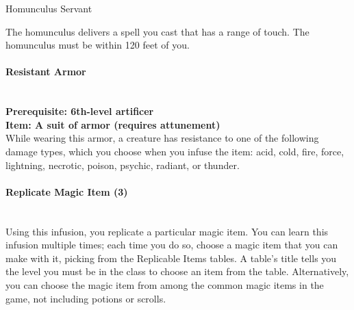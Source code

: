 {\begin{DndMonster}[width=0.5\textwidth]{Homunculus Servant}
	\DndMonsterAttack[
      name=Force Strike,
      distance=ranged, %
      mod=\calculateSpellAttack{\calculateModifier{\IntelligenceScoreValue}},
      range=30,
      targets=one target you can see,
      dmg=\DndDice{1d4} + PB,
      dmg-type=force,
    ]
    
	The homunculus delivers a spell you cast that has a range of touch. The homunculus must be within 120 feet of you.	
\end{DndMonster}
\paragraph*{Resistant Armor}\hfill\\
\textbf{Prerequisite: 6th-level artificer}\\
\textbf{Item: A suit of armor (requires attunement)}\\
While wearing this armor, a creature has resistance to one of the following damage types, which you choose when you infuse the item: acid, cold, fire, force, lightning, necrotic, poison, psychic, radiant, or thunder.\\
\paragraph*{Replicate Magic Item (3)}\hfill\\
Using this infusion, you replicate a particular magic item. You can learn this infusion multiple times; each time you do so, choose a magic item that you can make with it, picking from the Replicable Items tables. A table's title tells you the level you must be in the class to choose an item from the table. Alternatively, you can choose the magic item from among the common magic items in the game, not including potions or scrolls.

}
